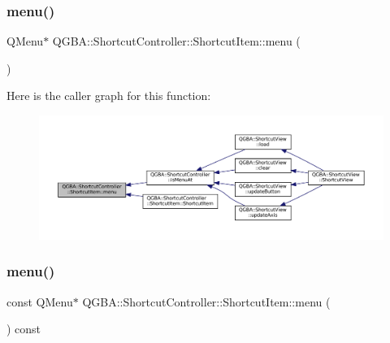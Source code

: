 \subsubsection{\texorpdfstring{menu()}{menu()}\hspace{0.1cm}{\footnotesize\ttfamily [1/2]}}
{\footnotesize\ttfamily Q\+Menu$\ast$ Q\+G\+B\+A\+::\+Shortcut\+Controller\+::\+Shortcut\+Item\+::menu (\begin{DoxyParamCaption}{ }\end{DoxyParamCaption})\hspace{0.3cm}{\ttfamily [inline]}}

Here is the caller graph for this function\+:
\nopagebreak
\begin{figure}[H]
\begin{center}
\leavevmode
\includegraphics[width=350pt]{class_q_g_b_a_1_1_shortcut_controller_1_1_shortcut_item_a296df2db2b49071da0109ea44b0ae8af_icgraph}
\end{center}
\end{figure}
\mbox{\label{class_q_g_b_a_1_1_shortcut_controller_1_1_shortcut_item_a953c2c20299838da7ddc74af40b5d1fd}} 
\subsubsection{\texorpdfstring{menu()}{menu()}\hspace{0.1cm}{\footnotesize\ttfamily [2/2]}}
{\footnotesize\ttfamily const Q\+Menu$\ast$ Q\+G\+B\+A\+::\+Shortcut\+Controller\+::\+Shortcut\+Item\+::menu (\begin{DoxyParamCaption}{ }\end{DoxyParamCaption}) const\hspace{0.3cm}{\ttfamily [inline]}}

